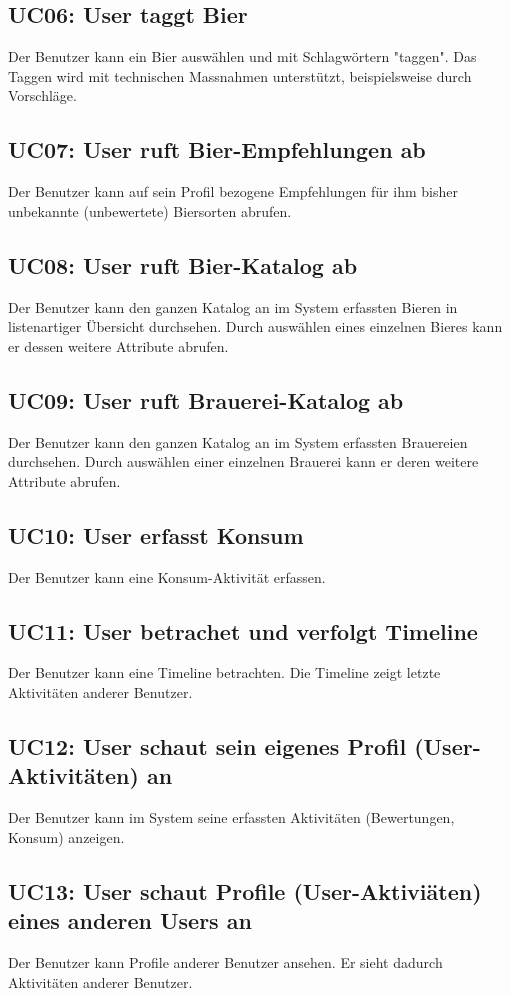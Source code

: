 \documentclass[10pt,a4paper]{scrartcl}
\begin{document}
\subsection*{UC06: User taggt Bier}
Der Benutzer kann ein Bier auswählen und mit Schlagwörtern "taggen". Das Taggen wird mit technischen Massnahmen unterstützt, beispielsweise durch Vorschläge.
\subsection*{UC07: User ruft Bier-Empfehlungen ab}
Der Benutzer kann auf sein Profil bezogene Empfehlungen für ihm bisher unbekannte (unbewertete) Biersorten abrufen.
\subsection*{UC08: User ruft Bier-Katalog ab}
Der Benutzer kann den ganzen Katalog an im System erfassten Bieren in listenartiger Übersicht durchsehen. Durch auswählen eines einzelnen Bieres kann er dessen weitere Attribute abrufen.
\subsection*{UC09: User ruft Brauerei-Katalog ab}
Der Benutzer kann den ganzen Katalog an im System erfassten Brauereien durchsehen. Durch auswählen einer einzelnen Brauerei kann er deren weitere Attribute abrufen.
\subsection*{UC10: User erfasst Konsum}
Der Benutzer kann eine Konsum-Aktivität erfassen.
\subsection*{UC11: User betrachet und verfolgt Timeline}
Der Benutzer kann eine Timeline betrachten. Die Timeline zeigt letzte Aktivitäten anderer Benutzer.
\subsection*{UC12: User schaut sein eigenes Profil (User-Aktivitäten) an}
Der Benutzer kann im System seine erfassten Aktivitäten (Bewertungen, Konsum) anzeigen.
\subsection*{UC13: User schaut Profile (User-Aktiviäten) eines anderen Users an}
Der Benutzer kann Profile anderer Benutzer ansehen. Er sieht dadurch Aktivitäten anderer Benutzer.
\end{document}
